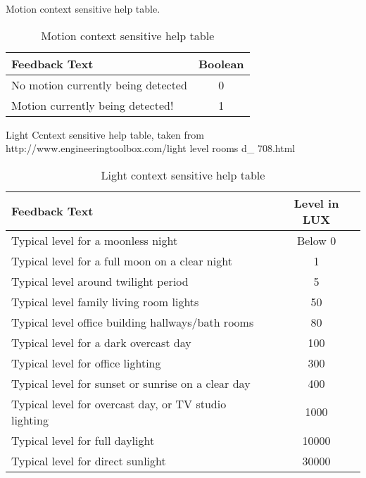 \documentclass{article}
\begin{document}
\newpage
\noindent
Motion context sensitive help table.

\begin{table}[H]
\def\arraystretch{2}%
\begin{center}
 \begin{tabular}{|| L{8cm} | c ||} 
 \hline
 \textbf{Feedback Text} & \textbf{Boolean}  \\ [0.5ex] 
 \hline\hline
 No motion currently being detected & 0 \\ 
 \hline
 Motion currently being detected! & 1 \\
 \hline
\end{tabular}
\end{center}
\caption{Motion context sensitive help table}
\label{table:testing_op_timings}
\end{table}

\noindent
Light Ccntext sensitive help table, taken from http://www.engineeringtoolbox.com/light\- level\- rooms\- d\_ 708.html

\begin{table}[H]
\def\arraystretch{2}%
\begin{center}
 \begin{tabular}{|| L{8cm} | c ||} 
 \hline
 \textbf{Feedback Text} & \textbf{Level in LUX}  \\ [0.5ex] 
 \hline\hline
 Typical level for a moonless night & Below 0 \\ 
 \hline
 Typical level for a full moon on a clear night & 1 \\
 \hline
 Typical level around twilight period & 5 \\
 \hline
 Typical level family living room lights & 50 \\ [1ex] 
 \hline
 Typical level office building hallways/bath rooms & 80 \\ [1ex] 
 \hline
 Typical level for a dark overcast day & 100 \\ [1ex] 
 \hline
 Typical level for office lighting & 300 \\ [1ex] 
 \hline
 Typical level for sunset or sunrise on a clear day & 400 \\ [1ex] 
 \hline
 Typical level for overcast day, or TV studio lighting & 1000 \\ [1ex] 
 \hline
 Typical level for full daylight & 10000 \\ [1ex] 
 \hline
 Typical level for direct sunlight & 30000 \\ [1ex] 
 \hline
\end{tabular}
\end{center}
\caption{Light context sensitive help table}
\label{table:testing_op_timings}
\end{table}
\end{document}
